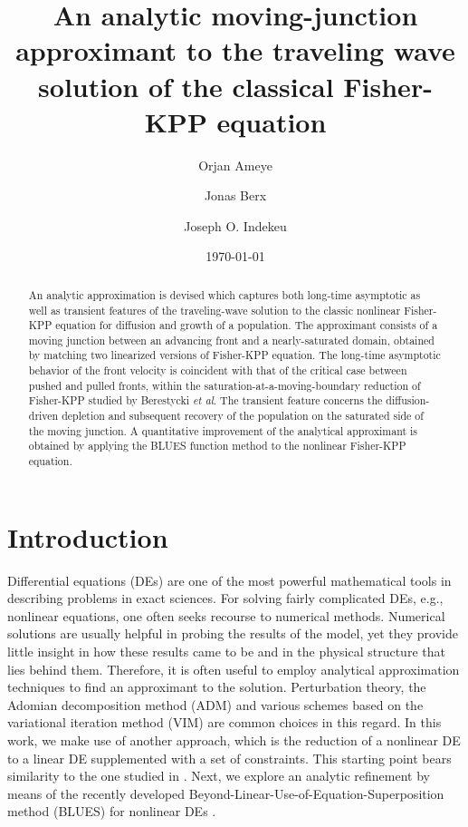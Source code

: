 \documentclass[amsmath,amssymb,amsfonts,aps,pre,preprint,superscriptaddress,showpacs,showkeys,longbibliography,nofootinbib]{revtex4-1}
\begin{document}
\title{An analytic moving-junction approximant to the traveling wave solution of the classical Fisher-KPP equation}

\author{Orjan Ameye}

\author{Jonas Berx}

\author{Joseph O. Indekeu}

\date{\today}

\begin{abstract}
An analytic approximation is devised which captures both long-time asymptotic as well as transient features of the traveling-wave solution to the classic nonlinear Fisher-KPP equation for diffusion and growth of a population. The approximant consists of a moving junction between an advancing front and a nearly-saturated domain, obtained by matching two linearized versions of Fisher-KPP equation. The long-time asymptotic behavior of the front velocity is coincident with that of the critical case between pushed and pulled fronts, within the saturation-at-a-moving-boundary reduction of Fisher-KPP studied by Berestycki {\em et al}. The transient feature concerns the diffusion-driven depletion and subsequent recovery of the population on the saturated side of the moving junction. A quantitative  improvement of the analytical approximant is obtained by applying the BLUES function method to the nonlinear Fisher-KPP equation. 
\end{abstract}

\maketitle

\section{Introduction}\label{sec:intro}
Differential equations (DEs) are one of the most powerful mathematical tools in describing problems in exact sciences. For solving fairly complicated DEs, e.g., nonlinear equations, one often seeks recourse to numerical methods. Numerical solutions are usually helpful in probing the results of the model, yet they provide little insight in how these results came to be and in the physical structure that lies behind them. Therefore, it is often useful to employ analytical approximation techniques to find an approximant to the solution. Perturbation theory, the Adomian decomposition method (ADM) and various schemes based on the variational iteration method (VIM) are common choices in this regard. In this work, we make use of another approach, which is the reduction of a nonlinear DE to a linear DE supplemented with a set of constraints. This starting point bears similarity to the one studied in  \citet{Berestycki2017}. Next, we explore an analytic refinement by means of the recently developed Beyond-Linear-Use-of-Equation-Superposition method (BLUES) for nonlinear DEs \cite{Indekeu_2018,Berx_2020,Berx_2021}.
\end{document}
